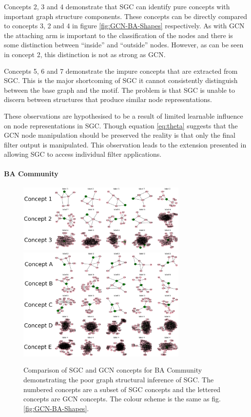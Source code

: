 Concepts 2, 3 and 4 demonstrate that SGC can identify pure concepts with important graph structure components.
These concepts can be directly compared to concepts 3, 2 and 4 in figure \ref{fig:GCN-BA-Shapes} respectively.
As with GCN the attaching arm is important to the classification of the nodes and there is some distinction between ``inside'' and ``outside'' nodes.
However, as can be seen in concept 2, this distinction is not as strong as GCN.

Concepts 5, 6 and 7 demonstrate the impure concepts that are extracted from SGC.
This is the major shortcoming of SGC it cannot consistently distinguish between the base graph and the motif.
The problem is that SGC is unable to discern between structures that produce similar node representations.

These observations are hypothesised to be a result of limited learnable influence on node representations in SGC.
Though equation \ref{eq:theta} suggests that the GCN node manipulation should be preserved the reality is that only the final filter output is manipulated.
This observation leads to the extension presented in  allowing SGC to access individual filter applications.

\paragraph{BA Community}
\begin{figure}
    \centering
    \includegraphics[width=0.75\textwidth]{figures/SGC-BA-Community}
    \includegraphics[width=0.75\textwidth]{figures/GCN-BA-Community}
    \caption{Comparison of SGC and GCN concepts for BA Community demonstrating the poor graph structural inference of SGC. The numbered concepts are a subset of SGC concepts and the lettered concepts are GCN concepts. The colour scheme is the same as fig. \ref{fig:GCN-BA-Shapes}.}
    \label{fig:BA-Community}
\end{figure}

